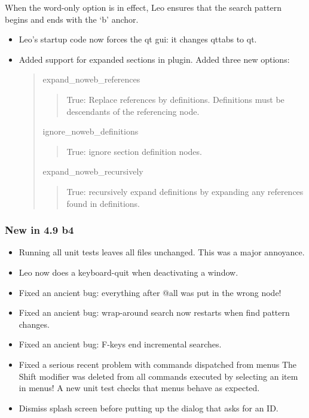 \documentclass[a4paper,10pt,english]{sphinxmanual}
\begin{document}
When the word-only option is in effect, Leo ensures that the search pattern
begins and ends with the `b' anchor.
\begin{itemize}
\item {} 
Leo's startup code now forces the qt gui: it changes qttabs to qt.

\item {} 
Added support for expanded sections in plugin.  Added three new options:
\begin{quote}

expand\_noweb\_references
\begin{quote}

True: Replace references by definitions.
Definitions must be descendants of the referencing node.
\end{quote}

ignore\_noweb\_definitions
\begin{quote}

True: ignore section definition nodes.
\end{quote}

expand\_noweb\_recursively
\begin{quote}

True: recursively expand definitions by expanding any
references found in definitions.
\end{quote}
\end{quote}

\end{itemize}


\subsubsection{New in 4.9 b4}
\label{what-is-new:new-in-4-9-b4}\begin{itemize}
\item {} 
Running all unit tests leaves all files unchanged. This was a major annoyance.

\item {} 
Leo now does a keyboard-quit when deactivating a window.

\item {} 
Fixed an ancient bug: everything after @all was put in the wrong node!

\item {} 
Fixed an ancient bug: wrap-around search now restarts when find pattern changes.

\item {} 
Fixed an ancient bug: F-keys end incremental searches.

\item {} 
Fixed a serious recent problem with commands dispatched from menus The Shift
modifier was deleted from all commands executed by selecting an item in menus!
A new unit test checks that menus behave as expected.

\item {} 
Dismiss splash screen before putting up the dialog that asks for an ID.

\end{itemize}
\end{document}
